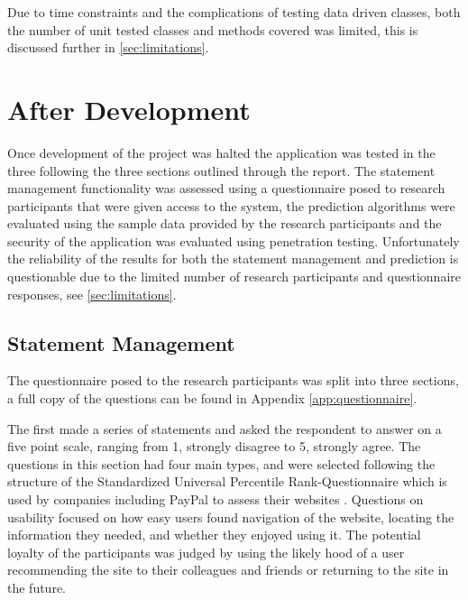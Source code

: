 Due to time constraints and the complications of testing data driven classes, both the number of unit tested classes and methods covered was limited, this is discussed further in \autoref{sec:limitations}.

\section{After Development}
Once development of the project was halted the application was tested in the three following the three sections outlined through the report. The statement management functionality was assessed using a questionnaire posed to research participants that were given access to the system, the prediction algorithms were evaluated using the sample data provided by the research participants and the security of the application was evaluated using penetration testing.
%
Unfortunately the reliability of the results for both the statement management and prediction is questionable due to the limited number of research participants and questionnaire responses, see \autoref{sec:limitations}.


\subsection{Statement Management}
The questionnaire posed to the research participants was split into three sections, a full copy of the questions can be found in Appendix \ref{app:questionnaire}.

The first made a series of statements and asked the respondent to answer on a five point scale, ranging from 1, strongly disagree to 5, strongly agree. The questions in this section had four main types, and were selected following the structure of the Standardized Universal Percentile Rank-Questionnaire which is used by companies including PayPal to assess their websites \parencite{sauro2011standardized}. 
%
Questions on usability focused on how easy users found navigation of the website, locating the information they needed, and whether they enjoyed using it.
%
The potential loyalty of the participants was judged by using the likely hood of a user recommending the site to their colleagues and friends or returning to the site in the future.

